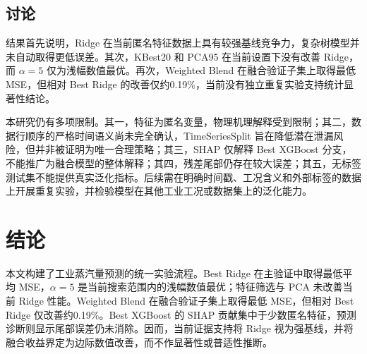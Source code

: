 \documentclass[UTF8,a4paper,twocolumn,zihao=5,fontset=none]{ctexart}
\begin{document}
\subsection{讨论}
结果首先说明，Ridge 在当前匿名特征数据上具有较强基线竞争力，复杂树模型并未自动取得更低误差。其次，KBest20 和 PCA95 在当前设置下没有改善 Ridge，而 $\alpha = 5$ 仅为浅幅数值最优。再次，Weighted Blend 在融合验证子集上取得最低 MSE，但相对 Best Ridge 的改善仅约0.19\%，当前没有独立重复实验支持统计显著性结论。

本研究仍有多项限制。其一，特征为匿名变量，物理机理解释受到限制；其二，数据行顺序的严格时间语义尚未完全确认，TimeSeriesSplit 旨在降低潜在泄漏风险，但并非被证明为唯一合理策略；其三，SHAP 仅解释 Best XGBoost 分支，不能推广为融合模型的整体解释；其四，残差尾部仍存在较大误差；其五，无标签测试集不能提供真实泛化指标。后续需在明确时间戳、工况含义和外部标签的数据上开展重复实验，并检验模型在其他工业工况或数据集上的泛化能力。

\section{结论}
本文构建了工业蒸汽量预测的统一实验流程。Best Ridge 在主验证中取得最低平均 MSE，$\alpha = 5$ 是当前搜索范围内的浅幅数值最优；特征筛选与 PCA 未改善当前 Ridge 性能。Weighted Blend 在融合验证子集上取得最低 MSE，但相对 Best Ridge 仅改善约0.19\%。Best XGBoost 的 SHAP 贡献集中于少数匿名特征，预测诊断则显示尾部误差仍未消除。因而，当前证据支持将 Ridge 视为强基线，并将融合收益界定为边际数值改善，而不作显著性或普适性推断。


\balance
{


}
\end{document}
